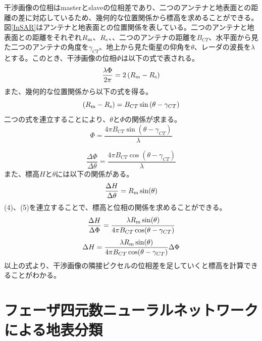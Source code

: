 \documentclass[a4j, twocolumn]{jsarticle}
\begin{document}
干渉画像の位相はmasterとslaveの位相差であり、二つのアンテナと地表面との距離の差に対応しているため、幾何的な位置関係から標高を求めることができる。図\ref{InSAR}はアンテナと地表面との位置関係を表している。二つのアンテナと地表面との距離をそれぞれ$R_{\rm{m}}$、$R_{\rm{s}}$、、二つのアンテナの距離を$B_{CT} $、水平面から見た二つのアンテナの角度を$\gamma _{CT} $、地上から見た衛星の仰角を$\theta$、レーダの波長を$\lambda$とする。このとき、干渉画像の位相$\Phi $は以下の式で表される。
\begin{equation}
\frac{\lambda \Phi }{ 2\pi } = 2\left( R_{\rm{m}}-R_{\rm{s}} \right)
\end{equation}
また、幾何的な位置関係から以下の式を得る。
\begin{equation}
\left( R_{\rm{m}}-R_{\rm{s}}\right) = B_{CT} \sin \left( \theta - \gamma _{CT} \right)
\end{equation}
二つの式を連立することにより、$ \theta $と$ \Phi $の関係が求まる。
\begin{equation}
\Phi =\frac{ 4\pi B_{CT} \sin (\theta - \gamma _{CT}) }{ \lambda }
\end{equation}

\begin{equation}
\frac{\Delta \Phi }{\Delta \theta } =\frac{ 4\pi B_{CT} \cos (\theta - \gamma _{CT})}{\lambda }
\end{equation}
また、標高$H$と$\theta$には以下の関係がある。
\begin{equation}
\frac{\Delta H}{\Delta \theta } =R_{\rm{m}} \sin (\theta )
\end{equation}
(4)、(5)を連立することで、標高と位相の関係を求めることができる。
\begin{equation}
\frac{\Delta H}{\Delta \Phi } =\cfrac{\lambda R_{\rm{m}} \sin (\theta )}{ 4\pi B_{CT} \cos (\theta - \gamma _{CT})}
\end{equation}
\begin{equation}
\Delta H=\frac{\lambda R_{\rm{m}} \sin (\theta )}{ 4\pi B_{CT} \cos (\theta - \gamma _{CT})}\Delta \Phi
\label{dhdp}
\end{equation}
以上の式より、干渉画像の隣接ピクセルの位相差を足していくと標高を計算できることがわかる。

\section{フェーザ四元数ニューラルネットワークによる地表分類}
\end{document}
